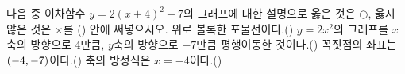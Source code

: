 다음 중 이차함수 $y=2(x+4)^2-7$의 그래프에 대한 설명으로 옳은 것은 $\bigcirc$, 옳지 않은 것은 $\times$를 (\quad) 안에 써넣으시오.
 위로 볼록한 포물선이다.\hfill(\qquad)
 $y=2x^2$의 그래프를 $x$축의 방향으로 $4$만큼, $y$축의 방향으로 $-7$만큼 평행이동한 것이다.\hfill(\qquad)
 꼭짓점의 좌표는 $(-4{,}\mkern3mu\mathopen{}-7)$이다.\hfill(\qquad)
 축의 방정식은 $x=-4$이다.\hfill(\qquad)
